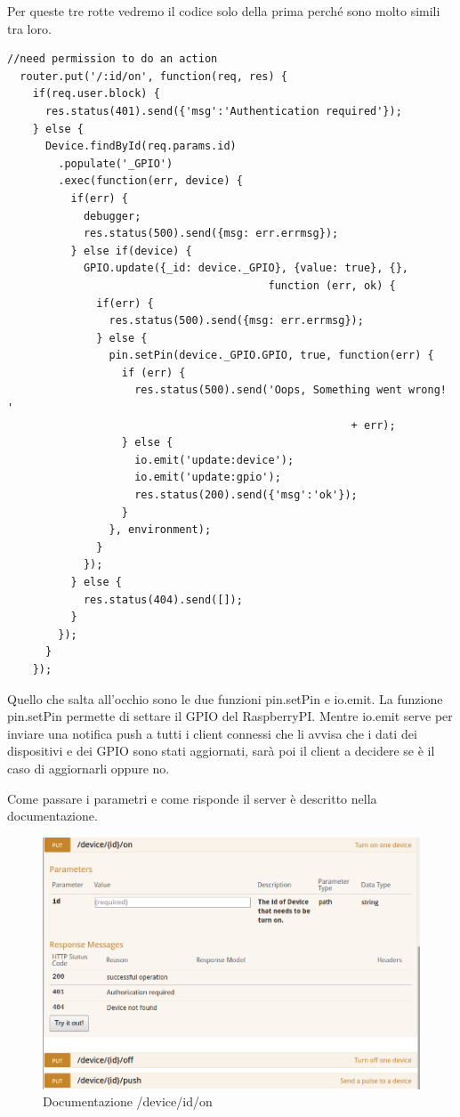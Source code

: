 \newpage
Per queste tre rotte vedremo il codice solo della prima perché sono molto simili tra loro.
\begin{lstlisting}[caption={/webserver/app/routes/device.js on}, style=javaScriptCode]
  //need permission to do an action
  router.put('/:id/on', function(req, res) {
    if(req.user.block) {
      res.status(401).send({'msg':'Authentication required'});
    } else {
      Device.findById(req.params.id)
        .populate('_GPIO')
        .exec(function(err, device) {
          if(err) {
            debugger;
            res.status(500).send({msg: err.errmsg});
          } else if(device) {
            GPIO.update({_id: device._GPIO}, {value: true}, {}, 
                                         function (err, ok) {
              if(err) {
                res.status(500).send({msg: err.errmsg});
              } else {
                pin.setPin(device._GPIO.GPIO, true, function(err) {
                  if (err) {
                    res.status(500).send('Oops, Something went wrong! '
                                                      + err);
                  } else {
                    io.emit('update:device');
                    io.emit('update:gpio');
                    res.status(200).send({'msg':'ok'});
                  }
                }, environment);
              }
            });
          } else {
            res.status(404).send([]);
          }
        });
      }
    });
\end{lstlisting}
Quello che salta all'occhio sono le due funzioni pin.setPin e io.emit.
La funzione pin.setPin permette di settare il GPIO del RaspberryPI.
Mentre io.emit serve per inviare una notifica push a tutti i client connessi che li avvisa che i dati dei dispositivi e dei GPIO sono stati aggiornati, sarà poi il client a decidere se è il caso di aggiornarli oppure no.  

Come passare i parametri e come risponde il server è descritto nella documentazione.
\begin{figure}[h]
\centering
\includegraphics[width=1\textwidth]{API/device_on.png} 
\caption{Documentazione /device/{id}/on}
\label{fig:device:on}
\end{figure}

